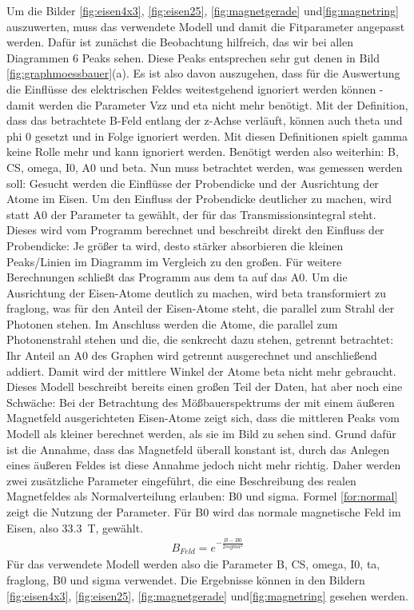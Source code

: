 \documentclass[german, %
parskip=full, %
bibliography=totoc, %
]{scrartcl}
\begin{document}
Um die Bilder \ref{fig:eisen4x3}, \ref{fig:eisen25}, \ref{fig:magnetgerade} und\ref{fig:magnetring} auszuwerten, muss das verwendete Modell und damit die Fitparameter angepasst werden. Dafür ist zunächst die Beobachtung hilfreich, das wir bei allen Diagrammen 6 Peaks sehen. Diese Peaks entsprechen sehr gut denen in Bild \ref{fig:graphmoessbauer}(a). Es ist also davon auszugehen, dass für die Auswertung die Einflüsse des elektrischen Feldes weitestgehend ignoriert werden können - damit werden die Parameter Vzz und eta nicht mehr benötigt. Mit der Definition, dass das betrachtete B-Feld entlang der z-Achse verläuft, können auch theta und phi 0 gesetzt und in Folge ignoriert werden. Mit diesen Definitionen spielt gamma keine Rolle mehr und kann ignoriert werden. Benötigt werden also weiterhin: B, CS, omega, I0, A0 und beta. Nun muss betrachtet werden, was gemessen werden soll: Gesucht werden die Einflüsse der Probendicke und der Ausrichtung der Atome im Eisen. Um den Einfluss der Probendicke deutlicher zu machen, wird statt A0 der Parameter ta gewählt, der für das Transmissionsintegral steht. Dieses wird vom Programm berechnet und beschreibt direkt den Einfluss der Probendicke: Je größer ta wird, desto stärker absorbieren die kleinen Peaks/Linien im Diagramm im Vergleich zu den großen. Für weitere Berechnungen schließt das Programm aus dem ta auf das A0. Um die  Ausrichtung der Eisen-Atome deutlich zu machen, wird beta transformiert zu fraglong, was für den Anteil der Eisen-Atome steht, die parallel zum Strahl der Photonen stehen. Im Anschluss werden die Atome, die parallel zum Photonenstrahl stehen und die, die senkrecht dazu stehen, getrennt betrachtet: Ihr Anteil an A0 des Graphen wird getrennt ausgerechnet und anschließend addiert. Damit wird der mittlere Winkel der Atome beta nicht mehr gebraucht. Dieses Modell beschreibt bereits einen großen Teil der Daten, hat aber noch eine Schwäche: Bei der Betrachtung des Mößbauerspektrums der mit einem äußeren Magnetfeld ausgerichteten Eisen-Atome zeigt sich, dass die mittleren Peaks vom Modell als kleiner berechnet werden, als sie im Bild zu sehen sind. Grund dafür ist die Annahme, dass das Magnetfeld überall konstant ist, durch das Anlegen eines äußeren Feldes ist diese Annahme jedoch nicht mehr richtig. Daher werden zwei zusätzliche Parameter eingeführt, die eine Beschreibung des realen Magnetfeldes als Normalverteilung erlauben: B0 und sigma. Formel \ref{for:normal} zeigt die Nutzung der Parameter. Für B0 wird das normale magnetische Feld im Eisen, also \SI{33.3}{\tesla}, gewählt.
\begin{align}
B_{Feld} = e^{-\frac{B-B0}{2sigma^2}} \label{for:normal}
\end{align} 
Für das verwendete Modell werden also die Parameter B, CS, omega, I0, ta, fraglong, B0 und sigma verwendet. Die Ergebnisse können in den Bildern \ref{fig:eisen4x3}, \ref{fig:eisen25}, \ref{fig:magnetgerade} und\ref{fig:magnetring} gesehen werden.
\end{document}
